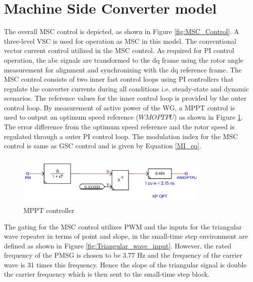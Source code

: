 \section{Machine Side Converter model}

The overall \gls{MSC} control is depicted, as shown in Figure \ref{fig:MSC_Control}. A three-level \gls{VSC} is used for operation as \gls{MSC} in this model. The conventional vector current control utilized in the \gls{MSC} control. As required for \gls{PI} control operation, the abc signals are transformed to the dq frame using the rotor angle measurement for alignment and synchronizing with the dq reference frame. The \gls{MSC} control consists of two inner fast control loops using \gls{PI} controllers that regulate the converter currents during all conditions i.e. steady-state and dynamic scenarios. The reference values for the inner control loop is provided by the outer control loop. By measurement of active power of the \gls{WG}, a \gls{MPPT} control is used to output an optimum speed reference ($WMOPTPU$) as shown in Figure \ref{fig:MPPT_control}. The error difference from the optimum speed reference and the rotor speed is regulated through a outer \gls{PI} control loop. The modulation index for the \gls{MSC} control is same as \gls{GSC} control and is given by Equation \ref{MI_eq}.

\begin{figure}[H]
\centering
    \includegraphics[height = 2.5cm,width = 9.5cm]{Diagrams/Appendix_A/MPPT_control.PNG}
    \caption{MPPT controller}
    \label{fig:MPPT_control}
\end{figure}

The gating for the \gls{MSC} control utilizes \gls{PWM} and the inputs for the triangular wave repeater in terms of point and slope, in the small-time step environment are defined as shown in Figure \ref{fig:Triangular_wave_input}. However, the rated frequency of the \gls{PMSG} is chosen to be 3.77 Hz and the frequency of the carrier wave is 31 times this frequency. Hence the slope of the triangular signal is double the carrier frequency which is then sent to the small-time step block.  

